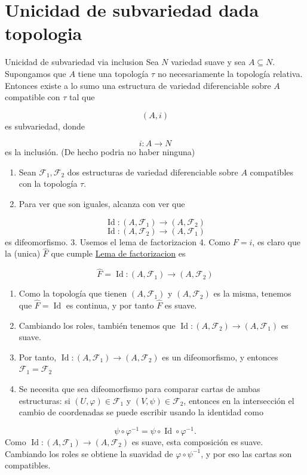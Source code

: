 \section{Unicidad de subvariedad dada topologia}
\begin{bookproposition}{Unicidad de subvariedad via inclusion}
Sea $N$ variedad suave y sea $A\subseteq N$. Supongamos que $A$ tiene una topología $\tau$ no necesariamente la topología relativa. Entonces existe a lo sumo una estructura de variedad diferenciable sobre $A$ compatible con $\tau$ tal que

\[
(A,i)
\]
es subvariedad, donde

\[
i:A\to N
\]
es la inclusión. (De hecho podria no haber ninguna)

\end{bookproposition}
\begin{bookproof}{}
\begin{enumerate}
\item Sean $\mathcal F_1,\mathcal F_2$ dos estructuras de variedad diferenciable sobre $A$ compatibles con la topología $\tau$.
\item Para ver que son iguales, alcanza con ver que
\end{enumerate}
\[
\operatorname{Id}:(A,\mathcal F_1)\to (A,\mathcal F_2)
\]
\[
\operatorname{Id}:(A,\mathcal F_2)\to (A,\mathcal F_1)
\]
es difeomorfismo. 3. Usemos el lema de factorizacion 
 4. Como $F=i$, es claro que la (unica) $\widehat{F}$ que cumple \hyperref[blk:1258d0]{Lema de factorizacion} es

\[
\widehat F=\operatorname{Id}:(A,\mathcal F_1)\to(A,\mathcal F_2)
\]
\begin{enumerate}[start=5]
\item Como la topología que tienen $(A,\mathcal F_1)$ y $(A,\mathcal F_2)$ es la misma, tenemos que $\widehat F=\operatorname{Id}$ es continua, y por tanto $\widehat F$ es suave.
\item Cambiando los roles, también tenemos que $\operatorname{Id}:(A,\mathcal F_2)\to(A,\mathcal F_1)$ es suave.
\item Por tanto, $\operatorname{Id}:(A,\mathcal F_1)\to(A,\mathcal F_2)$ es un difeomorfismo, y entonces $\mathcal F_1=\mathcal F_2$
\item Se necesita que sea difeomorfismo para comparar cartas de ambas estructuras: si $(U,\varphi)\in\mathcal F_1$ y $(V,\psi)\in\mathcal F_2$, entonces en la intersección el cambio de coordenadas se puede escribir usando la identidad como
\end{enumerate}
\[
\psi\circ\varphi^{-1}=\psi\circ\operatorname{Id}\circ\varphi^{-1}.
\]
Como $\operatorname{Id}:(A,\mathcal F_1)\to(A,\mathcal F_2)$ es suave, esta composición es suave. Cambiando los roles se obtiene la suavidad de $\varphi\circ\psi^{-1}$, y por eso las cartas son compatibles.

\bookqed
\end{bookproof}
